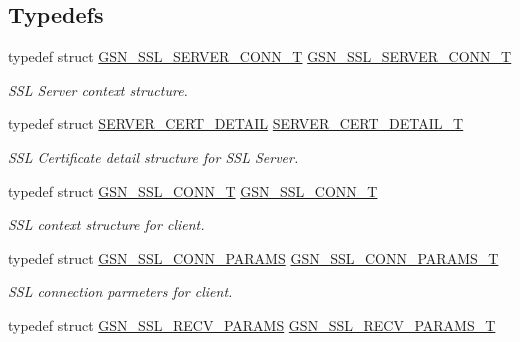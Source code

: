 \subsection*{Typedefs}
\begin{DoxyCompactItemize}
\item 
typedef struct \hyperlink{a00245}{GSN\_\-SSL\_\-SERVER\_\-CONN\_\-T} \hyperlink{a00590_a332d8f9cc0e8ad1eb424089450db11a8}{GSN\_\-SSL\_\-SERVER\_\-CONN\_\-T}
\begin{DoxyCompactList}\small\item\em SSL Server context structure. \end{DoxyCompactList}\item 
typedef struct \hyperlink{a00459}{SERVER\_\-CERT\_\-DETAIL} \hyperlink{a00590_a97fb9dc92ed454d9d7e3f3e18bd57264}{SERVER\_\-CERT\_\-DETAIL\_\-T}
\begin{DoxyCompactList}\small\item\em SSL Certificate detail structure for SSL Server. \end{DoxyCompactList}\item 
typedef struct \hyperlink{a00243}{GSN\_\-SSL\_\-CONN\_\-T} \hyperlink{a00590_a6cfb78a2ffc706dcf264400a3f3bcbcc}{GSN\_\-SSL\_\-CONN\_\-T}
\begin{DoxyCompactList}\small\item\em SSL context structure for client. \end{DoxyCompactList}\item 
typedef struct \hyperlink{a00242}{GSN\_\-SSL\_\-CONN\_\-PARAMS} \hyperlink{a00590_ad6dda2b8b9bdde45cf9ddc89943cd611}{GSN\_\-SSL\_\-CONN\_\-PARAMS\_\-T}
\begin{DoxyCompactList}\small\item\em SSL connection parmeters for client. \end{DoxyCompactList}\item 
typedef struct \hyperlink{a00244}{GSN\_\-SSL\_\-RECV\_\-PARAMS} \hyperlink{a00590_a1e6a9615d8936cfd33de0c31c8fb05a5}{GSN\_\-SSL\_\-RECV\_\-PARAMS\_\-T}
\end{DoxyCompactItemize}
